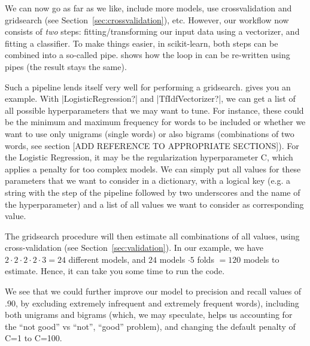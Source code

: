 We can now go as far as we like, include more models, use
crossvalidation and gridsearch (see
Section~\ref{sec:crossvalidation}), etc. However, our workflow now
consists of \emph{two} steps: fitting/transforming our input data
using a vectorizer, and fitting a classifier. To make things easier,
in scikit-learn, both steps can be combined into a so-called
pipe.  shows how the loop in
 can be re-written using pipes (the
result stays the same).


Such a pipeline lends itself very well for performing a
gridsearch.  gives you an example.  With
|LogisticRegression?| and |TfIdfVectorizer?|, we can get a list of all
possible hyperparameters that we may want to tune. For instance, these
could be the minimum and maximum frequency for words to be included or
whether we want to use only unigrams (single words) or also bigrams
(combinations of two words, see section [ADD REFERENCE TO APPROPRIATE
  SECTIONS]). For the Logistic Regression, it may be the
regularization hyperparameter C, which applies a penalty for too
complex models.  We can simply put all values for these parameters
that we want to consider in a dictionary, with a logical key (e.g. a string with the step of the pipeline followed by two underscores and the name of the hyperparameter) and a list of all values we want to consider as corresponding value.

The gridsearch procedure will then estimate all combinations of all
values, using cross-validation (see Section~\ref{sec:validation}). In
our example, we have $2 \cdot 2 \cdot 2 \cdot 2 \cdot 3 = 24$
different models, and $24$ models $\cdot 5$ folds $= 120$ models to
estimate. Hence, it can take you some time to run the code.


We see that we could further improve our model to precision and recall
values of .90, by excluding extremely infrequent and extremely
frequent words), including both unigrams and bigrams (which, we may
speculate, helps us accounting for the ``not good'' vs ``not'',
``good'' problem), and changing the default penalty of C=1 to C=100.

